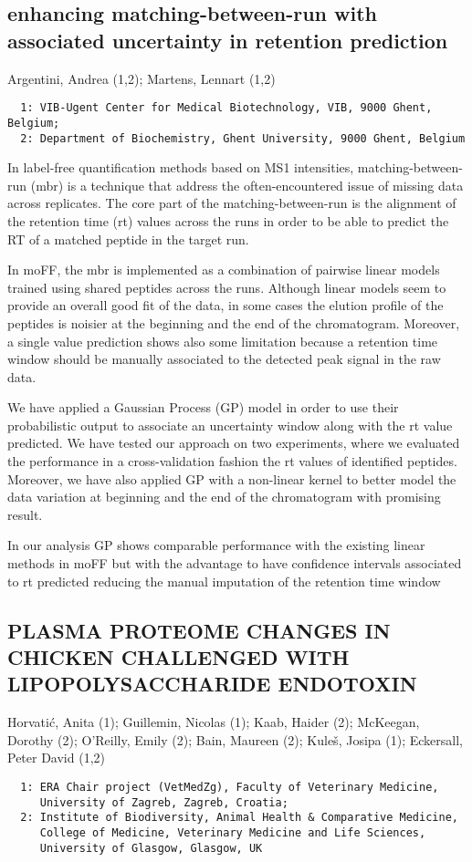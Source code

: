 {\subsection*{\color{eubicRed} enhancing matching-between-run with associated uncertainty in retention prediction}
{\color{eubicGray}Argentini, Andrea (1,2);
Martens, Lennart (1,2)}
{\color{eubicGray}\begin{verbatim}
  1: VIB-Ugent Center for Medical Biotechnology, VIB, 9000 Ghent, Belgium;
  2: Department of Biochemistry, Ghent University, 9000 Ghent, Belgium
\end{verbatim}}

In label-free quantification methods based on MS1 intensities, matching-between-run (mbr) is a technique that address the often-encountered issue of missing data across replicates. The core part of the matching-between-run is the alignment of the retention time (rt) values across the runs in order to be able to predict the RT of a matched peptide in the target run.

In moFF, the mbr is implemented as a combination of pairwise linear models trained using shared peptides across the runs. Although linear models seem to provide an overall good fit of the data, in some cases the elution profile of the peptides is noisier at the beginning and the end of the chromatogram. Moreover, a single value prediction shows also some limitation because a retention time window should be manually associated to the detected peak signal in the raw data.

We have applied a Gaussian Process (GP) model in order to use their probabilistic output to associate an uncertainty window along with the rt value predicted. We have tested our approach on two experiments, where we evaluated the performance in a cross-validation fashion the rt values of identified peptides. Moreover, we have also applied GP with a non-linear kernel to better model the data variation at beginning and the end of the chromatogram with promising result.

In our analysis GP shows comparable performance with the existing linear methods in moFF but with the advantage to have confidence intervals associated to rt predicted reducing the manual imputation of the retention time window


\subsection*{\color{eubicRed} PLASMA PROTEOME CHANGES IN CHICKEN CHALLENGED WITH LIPOPOLYSACCHARIDE ENDOTOXIN}
{\color{eubicGray}Horvatić, Anita (1);
Guillemin, Nicolas (1);
Kaab, Haider (2);
McKeegan, Dorothy (2);
O'Reilly, Emily (2);
Bain, Maureen (2);
Kuleš, Josipa (1);
Eckersall, Peter David (1,2)}
{\color{eubicGray}\begin{verbatim}
  1: ERA Chair project (VetMedZg), Faculty of Veterinary Medicine,
     University of Zagreb, Zagreb, Croatia;
  2: Institute of Biodiversity, Animal Health & Comparative Medicine,
     College of Medicine, Veterinary Medicine and Life Sciences,
     University of Glasgow, Glasgow, UK
\end{verbatim}}

}
